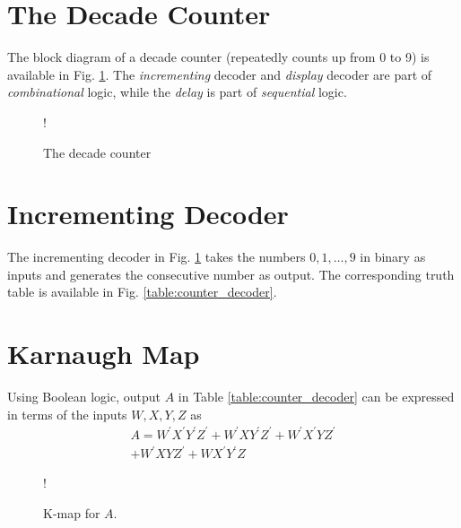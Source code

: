 \documentclass[journal,12pt,twocolumn]{IEEEtran}
\begin{document}
\section{The Decade Counter}
The block diagram of a decade counter (repeatedly counts up from 0 to 9)
is available in Fig. \ref{fig:dec_counter}.  The {\em incrementing } decoder
and {\em display} decoder are part of {\em combinational} logic, while
the {\em delay} is part of {\em sequential} logic.
\begin{figure}[!h]
\resizebox {\columnwidth} {!} {

}
\caption{The decade counter}
\label{fig:dec_counter}
\end{figure}
%
\section{Incrementing Decoder}
The incrementing decoder in Fig. \ref{fig:dec_counter}  takes the numbers $0,1,\dots,9$ in binary as inputs and generates
the consecutive number as output.  The corresponding truth table is available in Fig. \ref{table:counter_decoder}.

\section{Karnaugh Map}

%
Using Boolean logic, output $A$  in Table \ref{table:counter_decoder} can be expressed in terms of the inputs $W,X,Y,Z$ as
\begin{multline}
\label{eq:A}
A = W^{\prime}X^{\prime}Y^{\prime}Z^{\prime} + W^{\prime}XY^{\prime}Z^{\prime}
+W^{\prime}X^{\prime}YZ^{\prime}
\\
+W^{\prime}XYZ^{\prime}
+WX^{\prime}Y^{\prime}Z
\end{multline}
%
\begin{figure}[!h]
\resizebox {\columnwidth} {!} {

}
\caption{K-map for $A$.}
\label{fig:kmap_A}
\end{figure}
\end{document}
